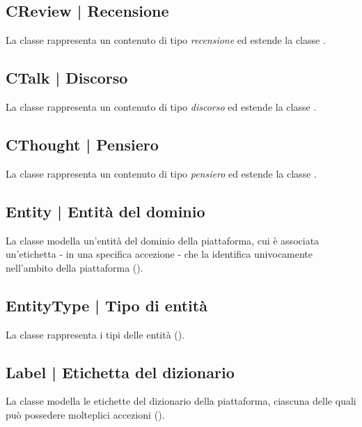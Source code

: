 \documentclass[10pt,a4paper,headinclude,footinclude,hidelinks]{scrreprt} %
\begin{document}
	\subsection[CReview]{CReview | Recensione}
	\label{sec:stage:design:model:review}
	La classe rappresenta un contenuto di tipo \textit{recensione} ed estende la classe \textit{}.

	\subsection[CTalk]{CTalk | Discorso}
	\label{sec:stage:design:model:talk}
	La classe rappresenta un contenuto di tipo \textit{discorso} ed estende la classe \textit{}.

	\subsection[CThought]{CThought | Pensiero}
	\label{sec:stage:design:model:thought}
	La classe rappresenta un contenuto di tipo \textit{pensiero} ed estende la classe \textit{}.

	\subsection[Entity]{Entity | Entità del dominio}
	\label{sec:stage:design:model:entity}
	La classe modella un'entità del dominio della piattaforma, cui è associata un'etichetta - in una specifica accezione - che la identifica univocamente nell'ambito della piattaforma (\textit{}).

	\subsection[EntityType]{EntityType | Tipo di entità}
	\label{sec:stage:design:model:entity-type}
	La classe rappresenta i tipi delle entità (\textit{}).

	\subsection[Label]{Label | Etichetta del dizionario}
	\label{sec:stage:design:model:label}
	La classe modella le etichette del dizionario della piattaforma, ciascuna delle quali può possedere molteplici accezioni (\textit{}).
\end{document}
